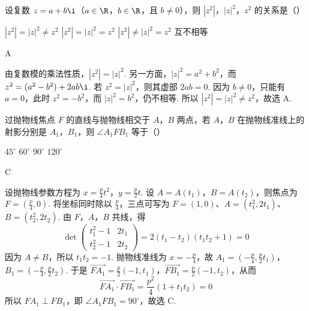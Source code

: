 \begin{problem}

设复数 \(z = a + b\i\)（\(a\in\R\)，\(b\in\R\)，且 \(b \neq 0\)），则 \(|z^2|\)，\(|z|^2\)，\(z^2\) 的关系是（\quad）

\choices
    {\(|z^{2}|=|z|^{2}\neq z^{2} \)}
    {\(|z^{2}|=|z|^{2}=z^{2} \)}
    {\(|z^{2}| \neq |z|^{2} = z^{2} \)}
    {互不相等}
\end{problem}

\begin{answer}
A
\end{answer}

\begin{solution}
由复数模的乘法性质，\(|z^2|=|z|^2\). 另一方面，\(|z|^2=a^2+b^2\)，而 \(z^2=(a^2-b^2)+2ab\i\). 若 \(z^2=|z|^2\)，则其虚部 \(2ab=0\). 因为 \(b\neq0\)，只能有 \(a=0\)，此时 \(z^2=-b^2\)，而 \(|z|^2=b^2\)，仍不相等. 所以 \(|z^2|=|z|^2\neq z^2\)，故选 A.
\end{solution}

\begin{problem}

过抛物线焦点 \(F\) 的直线与抛物线相交于 \(A\)，\(B\) 两点，若 \(A\)，\(B\) 在抛物线准线上的射影分别是 \(A_{1}\)，\(B_{1}\)，则 \(\angle A_{1}FB_{1}\) 等于（\quad）

\choices
    {\(45^{\circ}\)}
    {\(60^{\circ}\)}
    {\(90^{\circ}\)}
    {\(120^{\circ}\)}
\end{problem}

\begin{answer}
C
\end{answer}

\begin{solution}
设抛物线参数方程为 \(x=\frac{p}{4}t^2\)，\(y=\frac{p}{2}t\). 设 \(A=A(t_1)\)，\(B=A(t_2)\)，则焦点为 \(F=(\frac p4,0)\). 将坐标同时除以 \(\frac p4\)，三点可写为 \(F=(1,0)\)、\(A=(t_1^2,2t_1)\)、\(B=(t_2^2,2t_2)\). 由 \(F\)，\(A\)，\(B\) 共线，得
\[
\det\begin{pmatrix}t_1^2-1&2t_1\\t_2^2-1&2t_2\end{pmatrix}=2(t_1-t_2)(t_1t_2+1)=0
\]
因为 \(A\neq B\)，所以 \(t_1t_2=-1\). 抛物线准线为 \(x=-\frac p4\)，故 \(A_1=(-\frac p4,\frac p2t_1)\)，\(B_1=(-\frac p4,\frac p2t_2)\). 于是 \(\overrightarrow{FA_1}=\frac p2(-1,t_1)\)，\(\overrightarrow{FB_1}=\frac p2(-1,t_2)\)，从而
\[
\overrightarrow{FA_1}\cdot\overrightarrow{FB_1}=\frac{p^2}{4}(1+t_1t_2)=0
\]
所以 \(FA_1\perp FB_1\)，即 \(\angle A_1FB_1=90^\circ\)，故选 C.
\end{solution}

